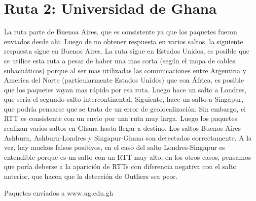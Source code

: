 \section{Ruta 2: Universidad de Ghana}

La ruta parte de Buenoa Aires, que es consistente ya que los paquetes fueron enviados desde ahi. Luego de no obtener respuesta en varios saltos, la siguiente respuesta sigue en Buenos Aires.
La ruta sigue en Estados Unidos, es posible que se utilice esta ruta a pesar de haber una mas corta (según el mapa de cables subacuáticos) porque al ser mas utilizadas las comunicaciones entre Argentina y America del Norte (particularmente Estados Unidos) que con África, es posible que los paquetes vayan mas rápido por esa ruta.
Luego hace un salto a Londres, que sería el segundo salto intercontinental. Siguiente, hace un salto a Singapur, que podría pensarse que se trata de un error de geolocalización. Sin embargo, el RTT es consistente con un envio por una ruta muy larga.
Luego los paquetes realizan varios saltos en Ghana hasta llegar a destino. 
Los saltos Buenos Aires-Ashburn, Ashburn-Londres y Singapur-Ghana son detectados correctamente. A la vez, hay muchos falsos positivos, en el caso del salto Londres-Singapur es entendible porque es un salto con un RTT muy alto, en los otros casos, pensamos que poría deberse a la aparición de RTTs con diferencia negativa con el salto anterior, que hacen que la detección de Outliers sea peor.


Paquetes enviados a www.ug.edu.gh

